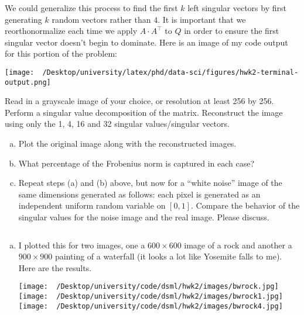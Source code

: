 \begin{homework}[e]
\begin{soln}
\begin{enumerate}[(a)]
        We could generalize this process to find the first $k$ left singular vectors by first generating $k$ random vectors rather than $4$. It is important that we reorthonormalize each time we apply $A\cdot A^\top$ to $Q$ in order to ensure the first singular vector doesn't begin to dominate. Here is an image of my code output for this portion of the problem:
      \begin{center}
        \texttt{[image: ~/Desktop/university/latex/phd/data-sci/figures/hwk2-terminal-output.png]}
        \label{fig:prob6b}
      \end{center}
    \end{enumerate}
  \end{soln}
  \prob Read in a grayscale image of your choice, or resolution at least 256 by 256. Perform a singular value decomposition of the matrix. Reconstruct the image using only the 1, 4, 16 and 32 singular values/singular vectors.
  \begin{enumerate}[(a)]
    \item Plot the original image along with the reconstructed images.
    \item What percentage of the Frobenius norm is captured in each case?
    \item Repeat steps (a) and (b) above, but now for a ``white noise'' image of the same dimensions generated as follows: each pixel is generated as an independent uniform random variable on $[0,1]$. Compare the behavior of the singular values for the noise image and the real image. Please discuss.
  \end{enumerate}
  \begin{soln}$ $
    \begin{enumerate}[(a)]
      \item I plotted this for two images, one a $600 \times 600$ image of a rock and another a $900 \times 900$ painting of a waterfall (it looks a lot like Yosemite falls to me). Here are the results.
      \begin{center}
        \texttt{[image: ~/Desktop/university/code/dsml/hwk2/images/bwrock.jpg]}
        \texttt{[image: ~/Desktop/university/code/dsml/hwk2/images/bwrock1.jpg]}
        \texttt{[image: ~/Desktop/university/code/dsml/hwk2/images/bwrock4.jpg]}

\end{center}
\end{enumerate}
\end{soln}
\end{homework}
